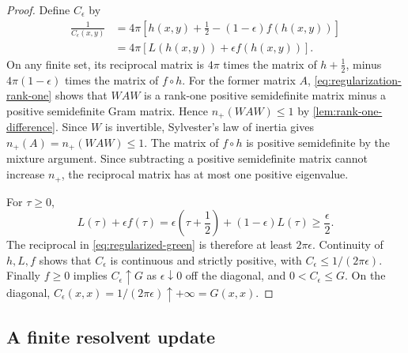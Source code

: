 \begin{proof}
Define $C_\epsilon$ by
\begin{equation}\label{eq:regularized-green}
 \begin{aligned}
 \frac1{C_\epsilon(x,y)}
 &=4\pi\left[h(x,y)+\frac12
                  -(1-\epsilon)f(h(x,y))\right]\\
 &=4\pi\left[L(h(x,y))+\epsilon f(h(x,y))\right].
 \end{aligned}
\end{equation}
On any finite set, its reciprocal matrix is $4\pi$ times the
matrix of $h+\tfrac12$, minus $4\pi(1-\epsilon)$ times the matrix
of $f\circ h$. For the former matrix $A$,
\cref{eq:regularization-rank-one} shows that $WAW$ is a rank-one
positive semidefinite matrix minus a positive semidefinite Gram
matrix. Hence $n_+(WAW)\le1$ by \cref{lem:rank-one-difference}.
Since $W$ is invertible, Sylvester's
law of inertia gives $n_+(A)=n_+(WAW)\le1$.
The matrix of $f\circ h$ is positive semidefinite by the mixture
argument.
Since subtracting a positive semidefinite matrix cannot increase
$n_+$, the reciprocal matrix has at most one positive eigenvalue.

For $\tau\ge0$,
\[
 L(\tau)+\epsilon f(\tau)
 =\epsilon\left(\tau+\frac12\right)+(1-\epsilon)L(\tau)
 \ge\frac\epsilon2.
\]
The reciprocal in \cref{eq:regularized-green} is therefore at least
$2\pi\epsilon$. Continuity of $h,L,f$ shows that $C_\epsilon$
is continuous and strictly positive, with
$C_\epsilon\le1/(2\pi\epsilon)$.
Finally $f\ge0$ implies $C_\epsilon\uparrow G$ as
$\epsilon\downarrow0$ off the diagonal, and $0<C_\epsilon\le G$.
On the diagonal,
$C_\epsilon(x,x)=1/(2\pi\epsilon)\uparrow+\infty=G(x,x)$.
\end{proof}

\subsection{A finite resolvent update}

